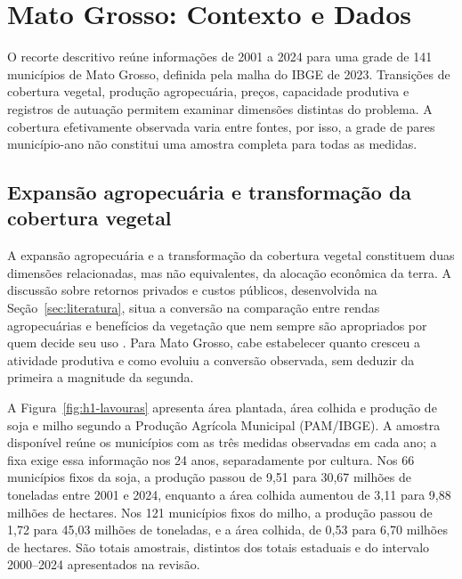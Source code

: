 \section{Mato Grosso: Contexto e Dados}
\label{sec:dados}

\begingroup
{}


O recorte descritivo reúne informações de 2001 a 2024 para uma grade de 141 municípios de Mato Grosso, definida pela malha do IBGE de 2023. Transições de cobertura vegetal, produção agropecuária, preços, capacidade produtiva e registros de autuação permitem examinar dimensões distintas do problema. A cobertura efetivamente observada varia entre fontes, por isso, a grade de \Hobs{} pares município-ano não constitui uma amostra completa para todas as medidas.

\subsection{Expansão agropecuária e transformação da cobertura vegetal}
\label{subsec:mt-expansao}

A expansão agropecuária e a transformação da cobertura vegetal constituem duas dimensões relacionadas, mas não equivalentes, da alocação econômica da terra. A discussão sobre retornos privados e custos públicos, desenvolvida na Seção~\ref{sec:literatura}, situa a conversão na comparação entre rendas agropecuárias e benefícios da vegetação que nem sempre são apropriados por quem decide seu uso \cite{Angelsen2010}. Para Mato Grosso, cabe estabelecer quanto cresceu a atividade produtiva e como evoluiu a conversão observada, sem deduzir da primeira a magnitude da segunda.

A Figura~\ref{fig:h1-lavouras} apresenta área plantada, área colhida e produção de soja e milho segundo a Produção Agrícola Municipal (PAM/IBGE). A amostra disponível reúne os municípios com as três medidas observadas em cada ano; a fixa exige essa informação nos 24 anos, separadamente por cultura. Nos 66 municípios fixos da soja, a produção passou de 9,51 para 30,67 milhões de toneladas entre 2001 e 2024, enquanto a área colhida aumentou de 3,11 para 9,88 milhões de hectares. Nos 121 municípios fixos do milho, a produção passou de 1,72 para 45,03 milhões de toneladas, e a área colhida, de 0,53 para 6,70 milhões de hectares. São totais amostrais, distintos dos totais estaduais e do intervalo 2000--2024 apresentados na revisão.

